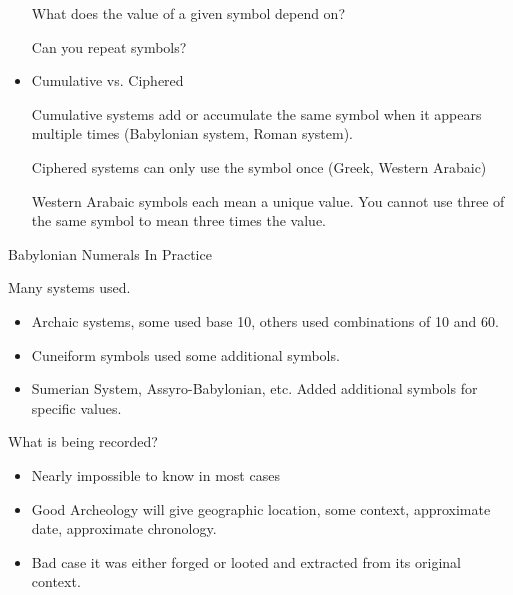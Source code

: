 \documentclass{report}
\begin{document}
\begin{description}
\begin{mdframed}
\begin{itemize}
\begin{mdframed}
                        What does the value of a given symbol
                        depend on?

                        Can you repeat symbols?
                    \end{mdframed}
                \item Cumulative vs. Ciphered
                    \begin{mdframed}
                        Cumulative systems add or accumulate
                        the same symbol when it appears multiple
                        times (Babylonian system, Roman system).

                        Ciphered systems can only use the symbol
                        once (Greek, Western Arabaic)
                        \begin{mdframed}
                            Western Arabaic symbols each mean
                             a unique value. You cannot use
                             three of the same symbol to mean
                             three times the value.
                        \end{mdframed}
                    \end{mdframed}
            \end{itemize}
        \end{mdframed}
        \pagebreak
    \item {\large Babylonian Numerals In Practice}
        \begin{mdframed}
            Many systems used.
            \begin{itemize}
                \item Archaic systems, some used base 10,
                    others used combinations of 10 and 60.
                \item Cuneiform symbols used some additional
                    symbols.
                \item Sumerian System, Assyro-Babylonian,
                    etc. Added additional symbols for specific
                    values.
            \end{itemize}
            What is being recorded?
            \begin{itemize}
                \item Nearly impossible to know in most cases
                \item Good Archeology will give geographic
                    location, some context, approximate date,
                    approximate chronology.
                \item Bad case it was either forged or looted
                    and extracted from its original context.
            \end{itemize}
        \end{mdframed}
\end{description}
\end{document}
